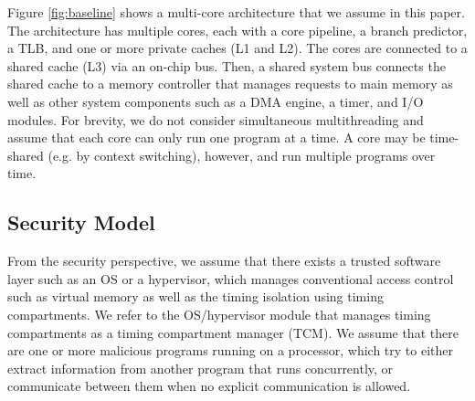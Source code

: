 Figure \ref{fig:baseline} shows a multi-core architecture that we assume
in this paper.
The architecture
has multiple cores, each with a core pipeline, a branch predictor, a TLB,
and one or more private caches (L1 and L2). 
The cores are connected to a shared cache (L3) via an on-chip bus. Then, a shared system 
bus connects the shared cache to a memory controller that manages requests to 
main memory as well as other system components such as a DMA engine, a timer, and I/O
modules.
For brevity, we do not consider simultaneous multithreading and assume that
each core can only run one program at a time.
A core may be time-shared (e.g. by context switching), however, and run multiple
programs over time.




\subsection{Security Model}

From the security perspective,
we assume that there exists a trusted software layer such as an OS or a 
hypervisor, 
which manages conventional access control such as virtual memory as well as
the timing isolation using timing compartments.
We refer to the OS/hypervisor module that manages timing compartments as
a timing compartment manager (TCM).
We assume that there are one or more malicious programs running on a processor,
which try to either extract information from another program that runs
concurrently, or communicate between them when no explicit communication is allowed. 

